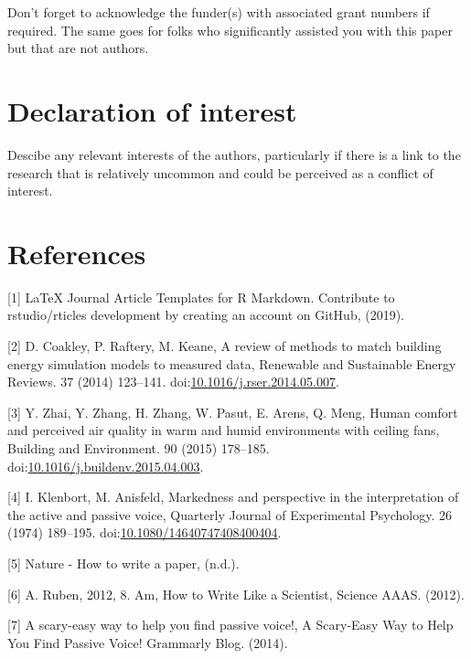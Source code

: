 \documentclass[]{elsarticle} %
\theoremstyle{definition}
\theoremstyle{definition}
\theoremstyle{definition}
\theoremstyle{remark}
\begin{document}
Don't forget to acknowledge the funder(s) with associated grant numbers
if required. The same goes for folks who significantly assisted you with
this paper but that are not authors.

\hypertarget{declaration-of-interest}{%
\section{Declaration of interest}\label{declaration-of-interest}}

Descibe any relevant interests of the authors, particularly if there is
a link to the research that is relatively uncommon and could be
perceived as a conflict of interest.

\hypertarget{references}{%
\section*{References}\label{references}}

\hypertarget{refs}{}
\leavevmode\hypertarget{ref-LaTeXJournalArticle2019}{}%
{[}1{]} LaTeX Journal Article Templates for R Markdown. Contribute to
rstudio/rticles development by creating an account on GitHub, (2019).

\leavevmode\hypertarget{ref-coakleyReviewMethodsMatch2014}{}%
{[}2{]} D. Coakley, P. Raftery, M. Keane, A review of methods to match
building energy simulation models to measured data, Renewable and
Sustainable Energy Reviews. 37 (2014) 123--141.
doi:\href{https://doi.org/10.1016/j.rser.2014.05.007}{10.1016/j.rser.2014.05.007}.

\leavevmode\hypertarget{ref-zhaiHumanComfortPerceived2015a}{}%
{[}3{]} Y. Zhai, Y. Zhang, H. Zhang, W. Pasut, E. Arens, Q. Meng, Human
comfort and perceived air quality in warm and humid environments with
ceiling fans, Building and Environment. 90 (2015) 178--185.
doi:\href{https://doi.org/10.1016/j.buildenv.2015.04.003}{10.1016/j.buildenv.2015.04.003}.

\leavevmode\hypertarget{ref-klenbortMarkednessPerspectiveInterpretation1974}{}%
{[}4{]} I. Klenbort, M. Anisfeld, Markedness and perspective in the
interpretation of the active and passive voice, Quarterly Journal of
Experimental Psychology. 26 (1974) 189--195.
doi:\href{https://doi.org/10.1080/14640747408400404}{10.1080/14640747408400404}.

\leavevmode\hypertarget{ref-NatureHowWrite}{}%
{[}5{]} Nature - How to write a paper, (n.d.).

\leavevmode\hypertarget{ref-rubenHowWriteScientist2012}{}%
{[}6{]} A. Ruben, 2012, 8. Am, How to Write Like a Scientist, Science
\textbar{} AAAS. (2012).

\leavevmode\hypertarget{ref-ScaryeasyWayHelp2014}{}%
{[}7{]} A scary-easy way to help you find passive voice!, A Scary-Easy
Way to Help You Find Passive Voice! \textbar{} Grammarly Blog. (2014).
\end{document}

